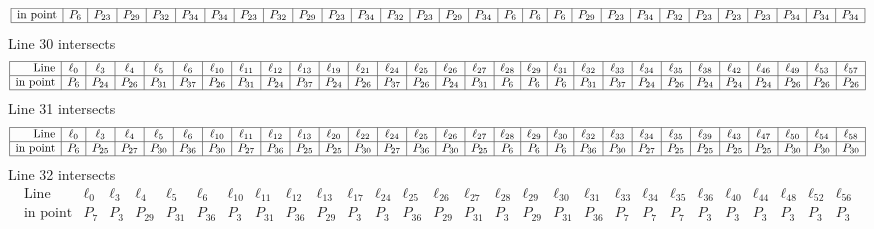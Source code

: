 \documentclass{article}
\begin{document}
{$$\begin{array}{|r*{28}{|c}|}
\hline
\mbox{in point}  & P_{6} & P_{23} & P_{29} & P_{32} & P_{34} & P_{34} & P_{23} & P_{32} & P_{29} & P_{23} & P_{34} & P_{32} & P_{23} & P_{29} & P_{34} & P_{6} & P_{6} & P_{6} & P_{29} & P_{23} & P_{34} & P_{32} & P_{23} & P_{23} & P_{23} & P_{34} & P_{34} & P_{34}\\
\hline
\end{array}
$$
Line 30 intersects 
$$
\begin{array}{|r*{28}{|c}|}
\hline
\mbox{Line}  & \ell_{0} & \ell_{3} & \ell_{4} & \ell_{5} & \ell_{6} & \ell_{10} & \ell_{11} & \ell_{12} & \ell_{13} & \ell_{19} & \ell_{21} & \ell_{24} & \ell_{25} & \ell_{26} & \ell_{27} & \ell_{28} & \ell_{29} & \ell_{31} & \ell_{32} & \ell_{33} & \ell_{34} & \ell_{35} & \ell_{38} & \ell_{42} & \ell_{46} & \ell_{49} & \ell_{53} & \ell_{57}\\
\hline
\mbox{in point}  & P_{6} & P_{24} & P_{26} & P_{31} & P_{37} & P_{26} & P_{31} & P_{24} & P_{37} & P_{24} & P_{26} & P_{37} & P_{26} & P_{24} & P_{31} & P_{6} & P_{6} & P_{6} & P_{31} & P_{37} & P_{24} & P_{26} & P_{24} & P_{24} & P_{24} & P_{26} & P_{26} & P_{26}\\
\hline
\end{array}
$$
Line 31 intersects 
$$
\begin{array}{|r*{28}{|c}|}
\hline
\mbox{Line}  & \ell_{0} & \ell_{3} & \ell_{4} & \ell_{5} & \ell_{6} & \ell_{10} & \ell_{11} & \ell_{12} & \ell_{13} & \ell_{20} & \ell_{22} & \ell_{24} & \ell_{25} & \ell_{26} & \ell_{27} & \ell_{28} & \ell_{29} & \ell_{30} & \ell_{32} & \ell_{33} & \ell_{34} & \ell_{35} & \ell_{39} & \ell_{43} & \ell_{47} & \ell_{50} & \ell_{54} & \ell_{58}\\
\hline
\mbox{in point}  & P_{6} & P_{25} & P_{27} & P_{30} & P_{36} & P_{30} & P_{27} & P_{36} & P_{25} & P_{25} & P_{30} & P_{27} & P_{36} & P_{30} & P_{25} & P_{6} & P_{6} & P_{6} & P_{36} & P_{30} & P_{27} & P_{25} & P_{25} & P_{25} & P_{25} & P_{30} & P_{30} & P_{30}\\
\hline
\end{array}
$$
Line 32 intersects 
$$
\begin{array}{|r*{27}{|c}|}
\hline
\mbox{Line}  & \ell_{0} & \ell_{3} & \ell_{4} & \ell_{5} & \ell_{6} & \ell_{10} & \ell_{11} & \ell_{12} & \ell_{13} & \ell_{17} & \ell_{24} & \ell_{25} & \ell_{26} & \ell_{27} & \ell_{28} & \ell_{29} & \ell_{30} & \ell_{31} & \ell_{33} & \ell_{34} & \ell_{35} & \ell_{36} & \ell_{40} & \ell_{44} & \ell_{48} & \ell_{52} & \ell_{56}\\
\hline
\mbox{in point}  & P_{7} & P_{3} & P_{29} & P_{31} & P_{36} & P_{3} & P_{31} & P_{36} & P_{29} & P_{3} & P_{3} & P_{36} & P_{29} & P_{31} & P_{3} & P_{29} & P_{31} & P_{36} & P_{7} & P_{7} & P_{7} & P_{3} & P_{3} & P_{3} & P_{3} & P_{3} & P_{3}\\

\end{array}$$}
\end{document}
